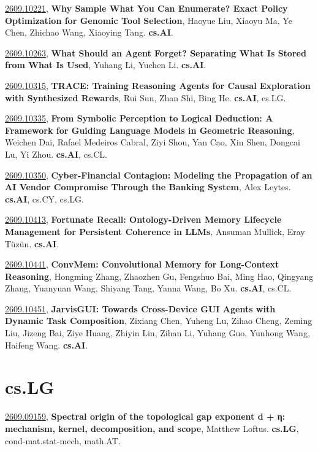 \documentclass[9pt, a4paper]{article}
\theoremstyle{plain}
\theoremstyle{definition}
\theoremstyle{remark}
\newcommand{\arxivwithtarget}[3]{\hypertarget{#1}{}\href{https://arxiv.org/abs/#1}{#1}, \textbf{\textcolor{arxivblue}{#2}}, #3. }
\begin{document}
\arxivwithtarget{2609.10221}{Why Sample What You Can Enumerate? Exact Policy Optimization for Genomic Tool Selection}{Haoyue Liu, Xiaoyu Ma, Ye Chen, Zhichao Wang, Xiaoying Tang}\textbf{cs.AI}.



\arxivwithtarget{2609.10263}{What Should an Agent Forget? Separating What Is Stored from What Is Used}{Yuhang Li, Yuchen Li}\textbf{cs.AI}.



\arxivwithtarget{2609.10315}{TRACE: Training Reasoning Agents for Causal Exploration with Synthesized Rewards}{Rui Sun, Zhan Shi, Bing He}\textbf{cs.AI}, cs.LG.



\arxivwithtarget{2609.10335}{From Symbolic Perception to Logical Deduction: A Framework for Guiding Language Models in Geometric Reasoning}{Weichen Dai, Rafael Medeiros Cabral, Ziyi Shou, Yan Cao, Xin Shen, Dongcai Lu, Yi Zhou}\textbf{cs.AI}, cs.CL.



\arxivwithtarget{2609.10350}{Cyber-Financial Contagion: Modeling the Propagation of an AI Vendor Compromise Through the Banking System}{Alex Leytes}\textbf{cs.AI}, cs.CY, cs.LG.



\arxivwithtarget{2609.10413}{Fortunate Recall: Ontology-Driven Memory Lifecycle Management for Persistent Coherence in LLMs}{Ansuman Mullick, Eray Tüzün}\textbf{cs.AI}.



\arxivwithtarget{2609.10441}{ConvMem: Convolutional Memory for Long-Context Reasoning}{Hongming Zhang, Zhaozhen Gu, Fengshuo Bai, Ming Hao, Qingyang Zhang, Yuanyuan Wang, Shiyang Tang, Yanna Wang, Bo Xu}\textbf{cs.AI}, cs.CL.



\arxivwithtarget{2609.10451}{JarvisGUI: Towards Cross-Device GUI Agents with Dynamic Task Composition}{Zixiang Chen, Yuheng Lu, Zihao Cheng, Zeming Liu, Jizeng Bai, Ziye Huang, Zhiyin Lin, Zihan Li, Yuhang Guo, Yunhong Wang, Haifeng Wang}\textbf{cs.AI}.



\section{cs.LG}
\arxivwithtarget{2609.09159}{Spectral origin of the topological gap exponent d + η: mechanism, kernel, decomposition, and scope}{Matthew Loftus}\textbf{cs.LG}, cond-mat.stat-mech, math.AT.
\end{document}

